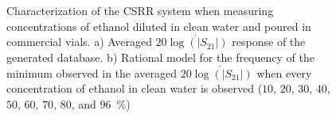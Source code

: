 \documentclass[journal,twoside,web]{ieeecolor}
\begin{document}
\begin{figure}[!t]
	\centering
	\caption{Characterization of the CSRR system when measuring concentrations of ethanol diluted in clean water and poured in commercial vials. a) Averaged $20\dot{\log\left(|S_{21}|\right)}$ response of the generated database. b) Rational model for the frequency of the minimum observed in the averaged $20\dot{\log\left(|S_{21}|\right)}$ when every concentration of ethanol in clean water is observed ($10$, $20$, $30$, $40$, $50$, $60$, $70$, $80$, and $96$~$\%$)}
	\label{fig:avgData}
\end{figure}
\end{document}
